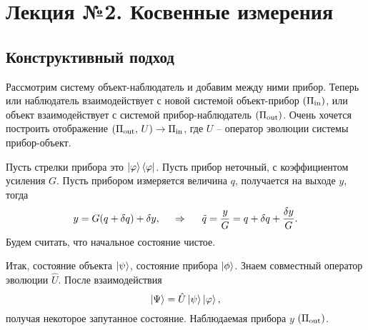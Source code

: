 \section{Лекция №2. Косвенные измерения}



\subsection*{Конструктивный подход}

Рассмотрим систему объект-наблюдатель и добавим между ними прибор. Теперь или наблюдатель взаимодействует с новой системой объект-прибор $(\Pi_{\textnormal{in}})$, или объект взаимодействует с системой прибор-наблюдатель $(\Pi_{\textnormal{out}})$. Очень хочется построить отображение $(\Pi_{\textnormal{out}},\, U) \to \Pi_{\textnormal{in}}$, где $U$ -- оператор эволюции системы прибор-объект.

Пусть стрелки прибора это $\left| \varphi \right\rangle \left\langle \varphi \right|$. Пусть прибор неточный, с коэффициентом усиления $G$. Пусть прибором измеряется величина $q$, получается на выходе $y$, тогда
\begin{equation*}
	y = G (q + \delta q) + \delta y,
	\hspace{0.5cm} \Rightarrow \hspace{0.5cm}
	\tilde{q} = \frac{y}{G} = q + \delta q + \frac{\delta y}{G}.
\end{equation*}
Будем считать, что начальное состояние чистое. 


Итак, состояние объекта $\left| \psi \right\rangle$, состояние прибора $\left| \phi \right\rangle$. Знаем совместный оператор эволюции $\hat{U}$. После взаимодействия 
\begin{equation*}
	\left| \Psi \right\rangle = \hat{U} \left| \psi \right\rangle \left| \varphi \right\rangle,
\end{equation*}
получая некоторое запутанное состояние. Наблюдаемая прибора $y$ $(\Pi_{\textnormal{out}})$. 


